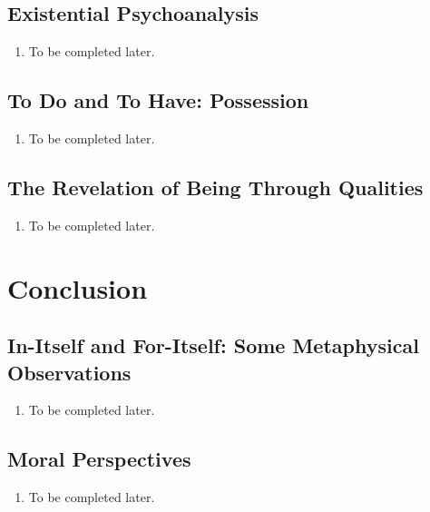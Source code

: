 \subsection{Existential Psychoanalysis}

\begin{enumerate}
  \item To be completed later.
\end{enumerate}

\subsection{To Do and To Have: Possession}

\begin{enumerate}
  \item To be completed later.
\end{enumerate}

\subsection{The Revelation of Being Through Qualities}

\begin{enumerate}
  \item To be completed later.
\end{enumerate}

\section{Conclusion}

\subsection{In-Itself and For-Itself: Some Metaphysical Observations}

\begin{enumerate}
  \item To be completed later.
\end{enumerate}

\subsection{Moral Perspectives}

\begin{enumerate}
  \item To be completed later.
\end{enumerate}
